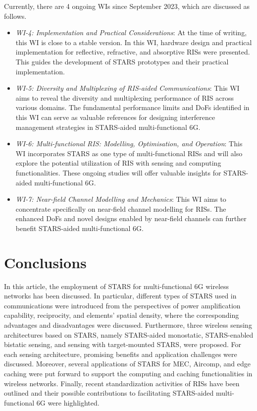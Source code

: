 \documentclass[journal]{IEEEtran}
\theoremstyle{definition}
\begin{document}
Currently, there are 4 ongoing WIs since September 2023, which are discussed as follows.

\begin{itemize}	
	\item \emph{WI-4: Implementation and Practical Considerations}: At the time of writing, this WI is close to a stable version. In this WI, hardware design and practical implementation for reflective, refractive, and absorptive RISs were presented. This guides the development of STARS prototypes and their practical implementation. 
    \item \emph{WI-5: Diversity and Multiplexing of RIS-aided Communications}: This WI aims to reveal the diversity and multiplexing performance of RIS across various domains. The fundamental performance limits and DoFs identified in this WI can serve as valuable references for designing interference management strategies in STARS-aided multi-functional 6G.
    \item \emph{WI-6: Multi-functional RIS: Modelling, Optimisation, and Operation}: This WI incorporates STARS as one type of multi-functional RISs and will also explore the potential utilization of RIS with sensing and computing functionalities. These ongoing studies will offer valuable insights for STARS-aided multi-functional 6G.
    \item \emph{WI-7: Near-field Channel Modelling and Mechanics}: This WI aims to concentrate specifically on near-field channel modelling for RISs. The enhanced DoFs and novel designs enabled by near-field channels can further benefit STARS-aided multi-functional 6G.
\end{itemize}

\section{Conclusions}
In this article, the employment of STARS for multi-functional 6G wireless networks has been discussed. In particular, different types of STARS used in communications were introduced from the perspectives of power amplification capability, reciprocity, and elements' spatial density, where the corresponding advantages and disadvantages were discussed. Furthermore, three wireless sensing architectures based on STARS, namely STARS-aided monostatic, STARS-enabled bistatic sensing, and sensing with target-mounted STARS, were proposed. For each sensing architecture, promising benefits and application challenges were discussed. Moreover, several applications of STARS for MEC, Aircomp, and edge caching were put forward to support the computing and caching functionalities in wireless networks. Finally, recent standardization activities of RISs have been outlined and their possible contributions to facilitating STARS-aided multi-functional 6G were highlighted.
\end{document}
